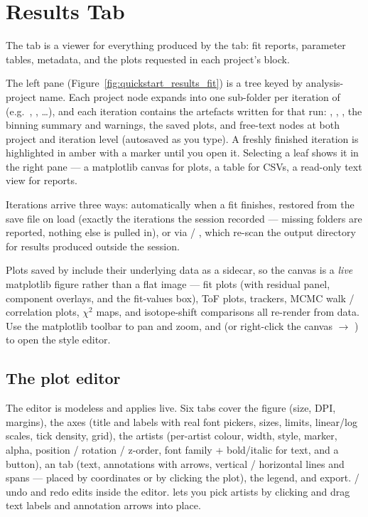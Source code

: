 \section{Results Tab}
\label{sec:results}

The  tab is a viewer for everything produced by the
 tab: fit reports, parameter tables, metadata, and the
plots requested in each project's  block.

The left pane (Figure~\ref{fig:quickstart_results_fit}) is a tree
keyed by analysis-project name. Each project node expands into one
sub-folder per iteration of  (e.g.\ ,
, \dots), and each iteration contains the artefacts
written for that run: , ,
, the binning summary and warnings, the saved plots,
and free-text  nodes at both project and iteration level
(autosaved as you type). A freshly finished iteration is highlighted
in amber with a  marker until you open it. Selecting a
leaf shows it in the right pane --- a matplotlib canvas for plots, a
table for CSVs, a read-only text view for reports.

Iterations arrive three ways: automatically when a fit finishes,
restored from the save file on load (exactly the iterations the
session recorded --- missing folders are reported, nothing else is
pulled in), or via  / , which
re-scan the output directory for results produced outside the
session.

Plots saved by \denis{} include their underlying data as a
 sidecar, so the canvas is a \emph{live} matplotlib
figure rather than a flat image --- fit plots (with residual panel,
component overlays, and the fit-values box), ToF plots, trackers,
MCMC walk / correlation plots, $\chi^2$ maps, and isotope-shift
comparisons all re-render from data. Use the matplotlib toolbar to
pan and zoom, and  (or right-click the canvas
$\rightarrow$ ) to open the style editor.

\subsection{The plot editor}

The editor is modeless and applies live. Six tabs cover the figure
(size, DPI, margins), the axes (title and labels with real font
pickers, sizes, limits, linear/log scales, tick density, grid), the
artists (per-artist colour, width, style, marker, alpha, position /
rotation / z-order, font family + bold/italic for text, and a
 button), an  tab (text, annotations
with arrows, vertical / horizontal lines and spans --- placed by
coordinates or by clicking the plot), the legend, and export.
 /  undo and redo edits inside the editor.
 lets you pick artists by
clicking and drag text labels and annotation arrows into place.


